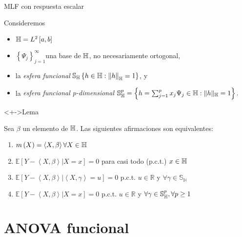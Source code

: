 \documentclass[10pt,spanish,handout]{beamer}\usepackage[]{graphicx}\usepackage[]{color}
\begin{document}
\begin{frame}{MLF con respuesta escalar}

Consideremos
\begin{itemize}[<+->]
\item $\mathbb{H}=L^{2}\left[a,b\right]$
\item $\left\{ \Psi_{j}\right\} _{j=1}^{\infty}$una base de $\mathbb{H}$, no necesariamente
ortogonal,
\item la \emph{esfera funcional} $\mathbb{S_{H}}\left\{ h\in\mathbb{H}:\left\Vert h\right\Vert _{\mathbb{H}}=1\right\} $,
y
\item la \emph{esfera funcional p-dimensional $\mathbb{S}_{\mathbb{H}}^{p}=\left\{ h=\sum_{j=1}^{p}x_{j}\Psi_{j}\in\mathbb{H}:\|h\|_{\mathbb{H}}=1\right\} $. }
\end{itemize}
\begin{exampleblock}<+->{Lema \cite{Patilea 2012}}

Sea $\beta$ un elemento de $\mathbb{H}$. Las siguientes afirmaciones son
equivalentes:
\begin{enumerate}[<+->]
\item $m\left(X\right)=\left\langle X,\beta\right\rangle \forall X\in\mathbb{H}$
\item $\mathbb{E}\left[Y-\left\langle X,\beta\right\rangle |X=x\right]=0$
para casi todo (p.c.t.) $x\in\mathbb{H}$
\item $\mathbb{E}\left[Y-\left\langle X,\beta\right\rangle |\left\langle X,\gamma\right\rangle =u\right]=0$
p.c.t. $u\in\mathbb{R}$ y $\forall\gamma\in\mathbb{S_{H}}$
\item $\mathbb{E}\left[Y-\left\langle X,\beta\right\rangle |X=x\right]=0$
p.c.t. $u\in\mathbb{R}$ y $\forall\gamma\in\mathbb{S}_{\mathbb{H}}^{p},\forall p\geq1$
\end{enumerate}
\end{exampleblock}
\end{frame}

\section[ANOVA funcional]{ANOVA funcional }
\end{document}
